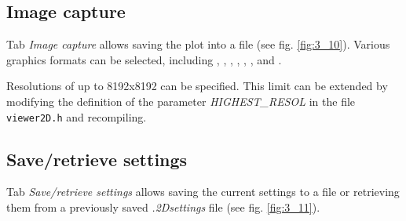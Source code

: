 \documentclass[10pt]{article}
\begin{document}

\subsection{Image capture\label{sec:3.8}}

Tab {\it Image capture} allows saving the plot into a file  
(see fig. \ref{fig:3_10}). Various graphics formats can be selected, including  
\png{ }, \jpg, \bmp, \ppm, \tiff, \xbm, and \xpm.  

Resolutions of up to 8192x8192 can be specified.  
This limit can be extended by modifying the definition of the parameter  
{\it HIGHEST\_RESOL} in the file \texttt{viewer2D.h} and recompiling.   

\subsection{Save/retrieve settings\label{sec:3.9}}

Tab {\it Save/retrieve settings}  
allows saving the current settings to a file or retrieving them  
from a previously saved {\it .2Dsettings} file (see fig. \ref{fig:3_11}).  
\end{document}
